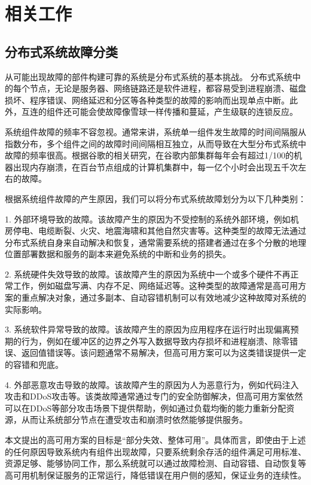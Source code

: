 
\chapter{相关工作}

\section{分布式系统故障分类}\label{failure_category}

从可能出现故障的部件构建可靠的系统是分布式系统的基本挑战。
分布式系统中的每个节点，无论是服务器、网络链路还是软件进程，都容易受到进程崩溃、磁盘损坏、程序错误、网络延迟和分区等各种类型的故障的影响而出现单点中断。此外，互连的组件还可能会使故障像雪球一样传播和蔓延，产生级联的连锁反应。

系统组件故障的频率不容忽视。通常来讲，系统单一组件发生故障的时间间隔服从指数分布，多个组件之间的故障时间间隔相互独立，从而导致在大型分布式系统中故障的频率很高。根据谷歌的相关研究\cite{beyer2016site}，在谷歌内部集群每年会有超过1/100的机器出现内存崩溃，在百台节点组成的计算机集群中，每一亿个小时会出现五千次左右的故障。

根据系统组件故障的产生原因，我们可以将分布式系统故障划分为以下几种类别\cite{michaud20062}：

1. 外部环境导致的故障。该故障产生的原因为不受控制的系统外部环境，例如机房停电、电缆断裂、火灾、地震海啸和其他自然灾害等。这种类型的故障无法通过分布式系统自身来自动解决和恢复，通常需要系统的搭建者通过在多个分散的地理位置部署数据和服务的副本来避免系统的中断和业务的损失。

2. 系统硬件失效导致的故障。该故障产生的原因为系统中一个或多个硬件不再正常工作，例如磁盘写满、内存不足、网络延迟等。这种类型的故障通常是高可用方案的重点解决对象，通过多副本、自动容错机制可以有效地减少这种故障对系统的实际影响。

3. 系统软件异常导致的故障。该故障产生的原因为应用程序在运行时出现偏离预期的行为，例如在缓冲区的边界之外写入数据导致内存损坏和进程崩溃、除零错误、返回值错误等。该问题通常不易解决，但高可用方案可以为这类错误提供一定的容错和兜底。

4. 外部恶意攻击导致的故障。该故障产生的原因为人为恶意行为，例如代码注入攻击和DDoS攻击等。该类故障通常通过专门的安全防御解决，但高可用方案依然可以在DDoS等部分攻击场景下提供帮助，例如通过负载均衡的能力重新分配资源，从而让系统部分节点在遭受攻击和崩溃时依然能够提供服务。

本文提出的高可用方案的目标是“部分失效、整体可用”。具体而言，即使由于上述的任何原因导致系统内有组件出现故障，只要系统剩余存活的组件满足可用标准、资源足够、能够协同工作，那么系统就可以通过故障检测、自动容错、自动恢复等高可用机制保证服务的正常运行，降低错误在用户侧的感知，保证业务的连续性。



